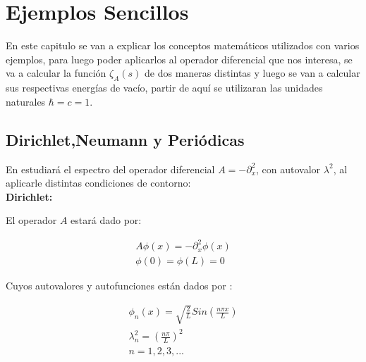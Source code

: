 \chapter{Ejemplos Sencillos}

    
    En este capitulo se van a explicar los conceptos matemáticos utilizados con varios ejemplos, para luego poder aplicarlos al operador diferencial que nos interesa, se va a calcular la función $ \zeta _A (s) $ de dos maneras distintas y luego se van a calcular sus respectivas energías de vacío, partir de aquí se utilizaran las unidades naturales $\hbar=c=1$.

\section{Dirichlet,Neumann y Periódicas}

En estudiará el espectro del operador diferencial $A = - \partial ^2 _x$, con autovalor $\lambda ^2$, al aplicarle distintas condiciones de contorno: \\

\textbf{Dirichlet:}

El operador $A$ estará dado por:

\begin{equation}
\begin{array}{c}
	A \phi (x) = - \partial _x ^2 \phi (x) \\
    \phi (0) = \phi(L) = 0 
\end{array}
\end{equation}


Cuyos autovalores y autofunciones están dados por  : 

\begin{equation}
\begin{array}{c}
	\phi _n (x) = \sqrt{\frac{2}{L}} Sin( \frac{n \pi x}{L} ) \\
	\lambda _n ^2 = \left( \frac{n \pi }{L} \right) ^2 \\
	n = 1,2,3, ...
\end{array}
\end{equation}

